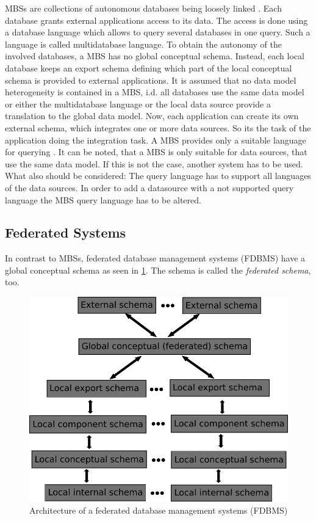 MBSs are collections of autonomous databases being loosely linked \cite[p. 93]{DBLP:books/dp/LeserN2006}. Each database grants external applications access to its data. The access is done using a database language which allows to query several databases in one query. Such a language is called multidatabase language. To obtain the autonomy  of the involved databases, a MBS has no global conceptual schema. Instead, each local database keeps an export schema defining which part of the local conceptual schema is provided to external applications.  
It is assumed that no data model heterogeneity is contained in a MBS, i.d. all databases use the same data model or either the multidatabase language or the local data source provide a translation to the global data model. Now, each application can create its own external schema, which integrates one or more data sources. So its the task of the application doing the integration task. A MBS provides only a suitable language for querying \cite[p. 94]{DBLP:books/dp/LeserN2006}.	
It can be noted, that a MBS is only suitable for data sources, that use the same data model. If this is not the case, another system has to be used. What also should be considered: The query language has to support all languages of the data sources. In order to add a datasource with a not supported query language the MBS query language has to be altered. 

\subsection{Federated Systems}

In contrast to MBSs, federated database management systems (FDBMS) have a global conceptual schema as seen in \ref{FDBMSArchitecture}. The schema is called the \emph{federated schema}, too.

\begin{figure}[H]
	\begin{center}
		\includegraphics[scale=0.5]{figures/federatedDatabaseArchitecture.pdf}
	\end{center}
	\caption{Architecture of a  federated database management systems (FDBMS) \cite[p. 95]{DBLP:books/dp/LeserN2006}}
	\label{FDBMSArchitecture}
\end{figure}

